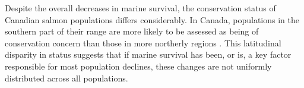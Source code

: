 \documentclass[12pt]{article}
\begin{document}


Despite the overall decreases in marine survival,
the conservation status of Canadian salmon populations differs
considerably. In Canada, populations in the southern part of their range are more
likely to be assessed as being of conservation concern than those in more
northerly regions \citep{Cosewic2010}. This latitudinal disparity in status
suggests that if marine survival has been, or is, a key factor responsible for
most population declines, these changes are not uniformly distributed across
all populations. 


\end{document}
